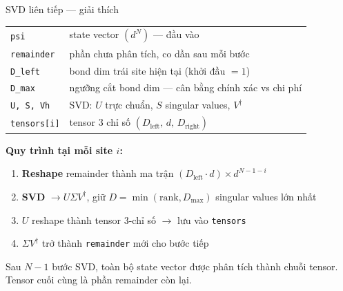 \documentclass[aspectratio=169, 11pt]{beamer}
\begin{document}
\begin{frame}[shrink=3]{SVD liên tiếp --- giải thích}

\vspace{6pt}
{\small
\renewcommand{\arraystretch}{1.4}
\begin{tabular}{@{}l@{\;:\;}p{10cm}@{}}
\texttt{psi}       & state vector $(d^N)$ — đầu vào \\
\texttt{remainder}  & phần chưa phân tích, co dần sau mỗi bước \\
\texttt{D\_left}    & bond dim trái site hiện tại (khởi đầu $=1$) \\
\texttt{D\_max}     & ngưỡng cắt bond dim — cân bằng chính xác vs chi phí \\
\texttt{U, S, Vh}  & SVD: $U$ trực chuẩn, $S$ singular values, $V^\dagger$ \\
\texttt{tensors[i]} & tensor 3 chỉ số $(D_\text{left},\, d,\, D_\text{right})$ \\
\end{tabular}}

\vspace{8pt}
{\small
\textcolor{qcyan}{\textbf{Quy trình tại mỗi site $i$:}}
\begin{enumerate}
  \item \textbf{Reshape} remainder thành ma trận $(D_\text{left}\!\cdot\!d) \times d^{N-1-i}$
  \item \textbf{SVD} $\to U\Sigma V^\dagger$, giữ $D = \min(\text{rank}, D_\text{max})$ singular values lớn nhất
  \item $U$ reshape thành tensor 3-chỉ số $\to$ lưu vào \texttt{tensors}
  \item $\Sigma V^\dagger$ trở thành \texttt{remainder} mới cho bước tiếp
\end{enumerate}}

\vspace{6pt}
{\small\textcolor{dimtext}{Sau $N{-}1$ bước SVD, toàn bộ state vector được phân tích thành chuỗi tensor. Tensor cuối cùng là phần remainder còn lại.}}

\end{frame}
\end{document}
